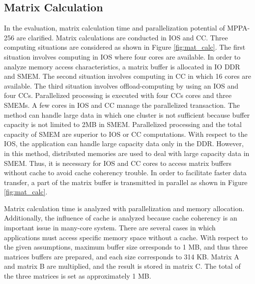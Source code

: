 \documentclass{sig-alternate-05-2015}
\begin{document}
\subsection{Matrix Calculation}
\label{sec:martix_eval}
In the evaluation, matrix calculation time and parallelization potential of MPPA-256 are clarified.
Matrix calculations are conducted in IOS and CC.
Three computing situations are considered as shown in Figure \ref{fig:mat_calc}.
The first situation involves computing in IOS where four cores are available.
In order to analyze memory access characteristics, a matrix buffer is allocated in IO DDR and SMEM.
The second situation involves computing in CC in which 16 cores are available.
The third situation involves offload-computing by using an IOS and four CCs.
Parallelized processing is executed with four CCs cores and three SMEMs.
A few cores in IOS and CC manage the parallelized transaction.
The method can handle large data in which one cluster is not
sufficient because buffer capacity is not limited to 2MB in SMEM.
Parallelized processing and the total capacity of SMEM are superior to IOS or CC computations. 
With respect to the IOS, the application can handle large capacity data only in the DDR.
However, in this method, distributed memories are used to deal with large capacity data in SMEM.
Thus, it is necessary for IOS and CC cores to access matrix buffers without cache to avoid cache coherency trouble.
In order to facilitate faster data transfer, a part of the matrix buffer is transmitted in parallel as shown in Figure \ref{fig:mat_calc}.

Matrix calculation time is analyzed with parallelization and memory allocation.
Additionally, the influence of cache is analyzed because cache coherency is an important issue in many-core system.
There are several cases in which applications must access specific memory space without a cache.
With respect to the given assumptions, maximum buffer size orresponds to 1 MB, and thus three matrices buffers are prepared, and each size corresponds to 314 KB.
Matrix A and matrix B are multiplied, and the result is stored in matrix C.
The total of the three matrices is set as approximately 1 MB.
\end{document}
